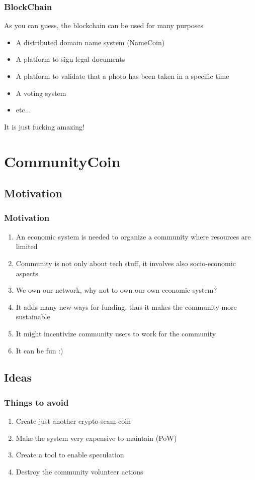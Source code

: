 \documentclass[usepdftitle=false,13pt]{beamer}
\begin{document}
\begin{frame}\frametitle{BlockChain}
	As you can guess, the blockchain can be used for many purposes
	\begin{itemize}
		\item A distributed domain name system (NameCoin)
		\item A platform to sign legal documents
		\item A platform to validate that a photo has been taken in a specific time
		\item A voting system
		\item etc...
	\end{itemize}
	It is just fucking amazing!
\end{frame}



\section{CommunityCoin}

\subsection{Motivation}

\begin{frame}\frametitle{Motivation}
	\begin{enumerate}
		\item An economic system is needed to organize a community where resources are limited
		\item Community is not only about tech stuff, it involves also socio-economic aspects
		\item We own our network, why not to own our own economic system?
		\item It adds many new ways for funding, thus it makes the community more sustainable
		\item It might incentivize community users to work for the community
		\item It can be fun :)
	\end{enumerate}
\end{frame}


\subsection{Ideas}
\begin{frame}\frametitle{Things to avoid}
	\begin{enumerate}
		\item Create just another crypto-scam-coin
		\item Make the system very expensive to maintain (PoW)
		\item Create a tool to enable speculation
		\item Destroy the community volunteer actions

	\end{enumerate}
\end{frame}
\end{document}
